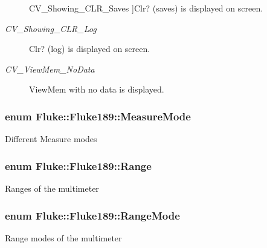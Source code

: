 \begin{Desc}
\begin{description}
{\hypertarget{classFluke_1_1Fluke189_a11aaf5d2869234a68421edbb9f836c6fa376c8ca6663cd9e5d1b2b1203f381146}{
CV\_\-Showing\_\-CLR\_\-Saves}
\label{classFluke_1_1Fluke189_a11aaf5d2869234a68421edbb9f836c6fa376c8ca6663cd9e5d1b2b1203f381146}
}]Clr? (saves) is displayed on screen. \item[{\em 
\hypertarget{classFluke_1_1Fluke189_a11aaf5d2869234a68421edbb9f836c6fa9a4fbce8291814fc698aa01bc696dbb8}{
CV\_\-Showing\_\-CLR\_\-Log}
\label{classFluke_1_1Fluke189_a11aaf5d2869234a68421edbb9f836c6fa9a4fbce8291814fc698aa01bc696dbb8}
}]Clr? (log) is displayed on screen. \item[{\em 
\hypertarget{classFluke_1_1Fluke189_a11aaf5d2869234a68421edbb9f836c6fa50f190b26efec7f2ff16d731d4807837}{
CV\_\-ViewMem\_\-NoData}
\label{classFluke_1_1Fluke189_a11aaf5d2869234a68421edbb9f836c6fa50f190b26efec7f2ff16d731d4807837}
}]ViewMem with no data is displayed. \end{description}
\end{Desc}

\hypertarget{classFluke_1_1Fluke189_a9122f47da123e82f492c9cfcb29e5f2e}{
\subsubsection[{MeasureMode}]{\setlength{\rightskip}{0pt plus 5cm}enum {\bf Fluke::Fluke189::MeasureMode}}}
\label{classFluke_1_1Fluke189_a9122f47da123e82f492c9cfcb29e5f2e}
Different Measure modes \hypertarget{classFluke_1_1Fluke189_a8112c52d8588d0cce468376e2faa83f5}{
\subsubsection[{Range}]{\setlength{\rightskip}{0pt plus 5cm}enum {\bf Fluke::Fluke189::Range}}}
\label{classFluke_1_1Fluke189_a8112c52d8588d0cce468376e2faa83f5}
Ranges of the multimeter \hypertarget{classFluke_1_1Fluke189_a470ac0e0a6e44ca3b33d2307ef29f37d}{
\subsubsection[{RangeMode}]{\setlength{\rightskip}{0pt plus 5cm}enum {\bf Fluke::Fluke189::RangeMode}}}
\label{classFluke_1_1Fluke189_a470ac0e0a6e44ca3b33d2307ef29f37d}
Range modes of the multimeter 

